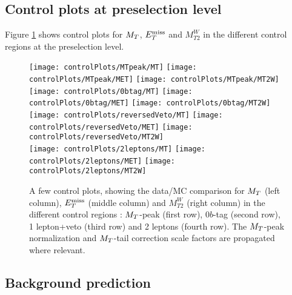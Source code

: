         \subsection{Control plots at preselection level}

        Figure \ref{fig:preselControlPlots} shows control plots for $M_T$, $E_T^\text{miss}$ and $M_{T2}^W$ in the different control regions at the preselection level.

            \begin{figure}[h!]
                \centering
                \texttt{[image: controlPlots/MTpeak/MT]}
                \texttt{[image: controlPlots/MTpeak/MET]}
                \texttt{[image: controlPlots/MTpeak/MT2W]}\\
                \texttt{[image: controlPlots/0btag/MT]}
                \texttt{[image: controlPlots/0btag/MET]}
                \texttt{[image: controlPlots/0btag/MT2W]}\\
                \texttt{[image: controlPlots/reversedVeto/MT]}
                \texttt{[image: controlPlots/reversedVeto/MET]}
                \texttt{[image: controlPlots/reversedVeto/MT2W]}\\
                \texttt{[image: controlPlots/2leptons/MT]}
                \texttt{[image: controlPlots/2leptons/MET]}
                \texttt{[image: controlPlots/2leptons/MT2W]}\\
                \caption{A few control plots, showing the data/MC comparison for $M_T$ (left column), 
                        $E_T^\text{miss}$ (middle column) and $M_{T2}^W$ (right column) in the different control
                        regions : $M_T$-peak (first row), $0b$-tag (second row), 1 lepton+veto (third
                        row) and 2 leptons (fourth row). The $M_T$-peak normalization and $M_T$-tail
                        correction scale factors are propagated where relevant.}
                        \label{fig:preselControlPlots}
            \end{figure}

        \subsection{Background prediction}

